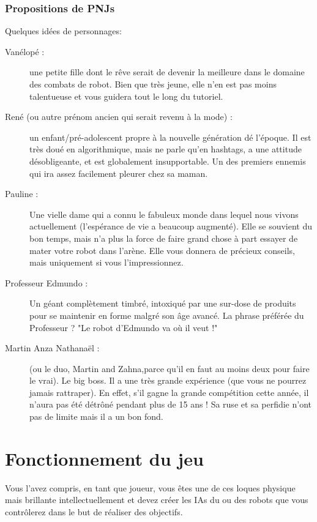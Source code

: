 \documentclass[10pt]{article}
\begin{document}
\section{Propositions de PNJs}
Quelques idées de personnages:

\begin{description}
\item [Vanélopé :] une petite fille dont le rêve serait de devenir la meilleure dans le domaine des combats de robot. Bien que très jeune, elle n'en est pas moins talentueuse et vous guidera tout le long du tutoriel.

\item [René (ou autre prénom ancien qui serait revenu à la mode) :] un enfant/pré-adolescent propre à la nouvelle génération dé l'époque. 
Il est très doué en algorithmique, mais ne parle qu'en hashtags, a une attitude désobligeante, et est globalement insupportable. Un des premiers ennemis qui ira assez facilement pleurer chez sa maman.

\item [Pauline :] Une vielle dame qui a connu le fabuleux monde dans lequel nous vivons actuellement (l'espérance de vie a beaucoup augmenté). Elle se souvient du bon temps, mais n'a plus la force de faire grand chose à part essayer de mater votre robot dans l'arène. Elle vous donnera de précieux conseils, mais uniquement si vous l'impressionnez.

\item [Professeur Edmundo :] Un géant complètement timbré, intoxiqué par une sur-dose de produits pour se maintenir en forme malgré son âge avancé. La phrase préférée du Professeur ? "Le robot d'Edmundo va où il veut !"
\item [Martin Anza Nathanaël :] (ou le duo, Martin and Zahna,parce qu'il en faut au moins deux pour faire le vrai). Le big boss. Il a une très grande expérience (que vous ne pourrez jamais rattraper). En effet, s'il gagne la grande compétition cette année, il n'aura pas été détrôné pendant plus de 15 ans ! Sa ruse et sa perfidie n'ont pas de limite mais il a un bon fond.
\end{description}
\newpage
\setcounter{section}{0}
\part{Fonctionnement du jeu}

Vous l'avez compris, en tant que joueur, vous êtes une de ces loques physique mais brillante intellectuellement et devez créer les IAs du ou des robots que vous contrôlerez dans le but de réaliser des objectifs.
\end{document}
